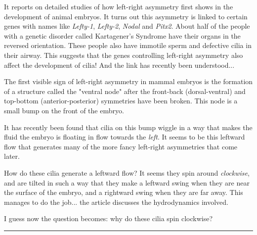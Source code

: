 It reports on detailed studies of how left-right asymmetry first shows
in the development of animal embryos.  It turns out this asymmetry is
linked to certain genes with names like \emph{Lefty-1}, \emph{Lefty-2}, 
\emph{Nodal} and \emph{Pitx2}.  
About half of the people with a genetic disorder called 
Kartagener's Syndrome have their organs in the reversed orientation.  
These people also have immotile sperm and defective cilia in their 
airway.  This suggests that the genes controlling left-right asymmetry
also affect the development of cilia!  And the link has recently been
understood...

The first visible sign of left-right asymmetry in mammal embryos 
is the formation of a structure called the "ventral node" after 
the front-back (dorsal-ventral) and top-bottom (anterior-posterior) 
symmetries have been broken.  This node is a small bump on the 
front of the embryo.  

It has recently been found that cilia on this bump wiggle in a 
way that makes the fluid the embryo is floating in flow towards 
the \emph{left}.   It seems to be this leftward flow that generates 
many of the more fancy left-right asymmetries that come later.

How do these cilia generate a leftward flow?  It seems they spin 
around \emph{clockwise}, and are tilted in such a way that they make 
a leftward swing when they are near the surface of the embryo, 
and a rightward swing when they are far away.  This manages to do
the job... the article discusses the hydrodynamics involved.  

I guess now the question becomes: why do these cilia spin clockwise?


\par\noindent\rule{\textwidth}{0.4pt}


